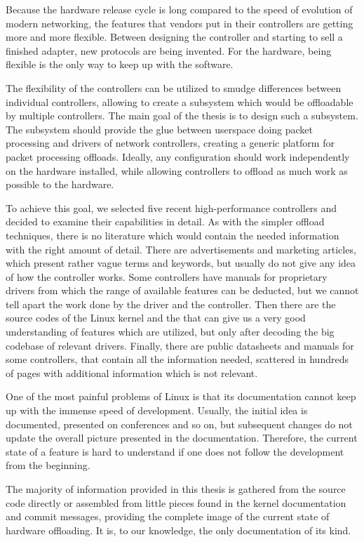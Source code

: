 Because the hardware release cycle is long compared to the speed of evolution
of modern networking, the features that vendors put in their controllers are
getting more and more flexible. Between designing the controller and starting
to sell a finished adapter, new protocols are being invented. For the hardware,
being flexible is the only way to keep up with the software.

The flexibility of the controllers can be utilized to smudge differences
between individual controllers, allowing to create a subsystem which would be
offloadable by multiple controllers. The main goal of the thesis is to design
such a subsystem. The subsystem should provide the glue between userspace doing
packet processing and drivers of network controllers, creating a generic
platform for packet processing offloads. Ideally, any configuration should work
independently on the hardware installed, while allowing controllers to offload
as much work as possible to the hardware.

To achieve this goal, we selected five recent high-performance controllers and
decided to examine their capabilities in detail. As with the simpler offload
techniques, there is no literature which would contain the needed information
with the right amount of detail. There are advertisements and marketing
articles, which present rather vague terms and keywords, but usually do not
give any idea of how the controller works. Some controllers have manuals for
proprietary drivers from which the range of available features can be
deducted, but we cannot tell apart the work done by the driver and the
controller. Then there are the source codes of the Linux kernel and the
 that can give us a very good understanding of features which are
utilized, but only after decoding the big codebase of relevant drivers.
Finally, there are public datasheets and manuals for some controllers, that
contain all the information needed, scattered in hundreds of pages with
additional information which is not relevant.

One of the most painful problems of Linux is that its documentation cannot keep
up with the immense speed of development. Usually, the initial idea is
documented, presented on conferences and so on, but subsequent changes do not
update the overall picture presented in the documentation. Therefore, the
current state of a feature is hard to understand if one does not follow the
development from the beginning.

The majority of information provided in this thesis is gathered from the source
code directly or assembled from little pieces found in the kernel documentation
and commit messages, providing the complete image of the current state of
hardware offloading. It is, to our knowledge, the only documentation of its
kind.

